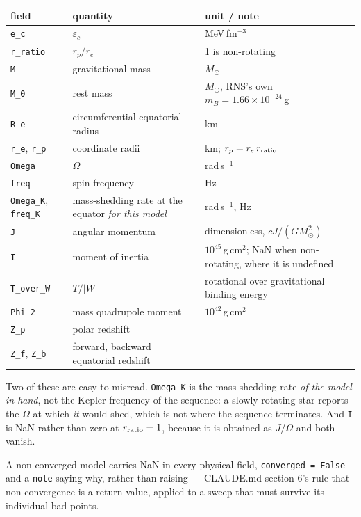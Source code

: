 \documentclass[aps,prc,onecolumn,superscriptaddress,nofootinbib,10pt]{revtex4-2}
\newcommand{\Msun}{M_\odot}
\begin{document}
\begin{center}
\begin{tabular}{lll}
\toprule
field & quantity & unit / note \\
\midrule
\texttt{e\_c}      & $\varepsilon_c$                    & MeV\,fm$^{-3}$ \\
\texttt{r\_ratio}  & $r_p/r_e$                          & 1 is non-rotating \\
\texttt{M}         & gravitational mass                  & $\Msun$ \\
\texttt{M\_0}      & rest mass                          & $\Msun$, RNS's own $m_B = 1.66\times10^{-24}$\,g \\
\texttt{R\_e}      & circumferential equatorial radius   & km \\
\texttt{r\_e}, \texttt{r\_p} & coordinate radii         & km; $r_p = r_e\,r_{\rm ratio}$ \\
\texttt{Omega}     & $\Omega$                            & rad\,s$^{-1}$ \\
\texttt{freq}      & spin frequency                      & Hz \\
\texttt{Omega\_K}, \texttt{freq\_K} & mass-shedding rate at the equator \emph{for this model} & rad\,s$^{-1}$, Hz \\
\texttt{J}         & angular momentum                    & dimensionless, $cJ/(G\Msun^2)$ \\
\texttt{I}         & moment of inertia                   & $10^{45}$\,g\,cm$^2$; NaN when non-rotating, where it is undefined \\
\texttt{T\_over\_W} & $T/|W|$                            & rotational over gravitational binding energy \\
\texttt{Phi\_2}    & mass quadrupole moment              & $10^{42}$\,g\,cm$^2$ \\
\texttt{Z\_p}      & polar redshift                      & \\
\texttt{Z\_f}, \texttt{Z\_b} & forward, backward equatorial redshift & \\
\bottomrule
\end{tabular}
\end{center}

\noindent
Two of these are easy to misread. \texttt{Omega\_K} is the mass-shedding rate
\emph{of the model in hand}, not the Kepler frequency of the sequence: a slowly
rotating star reports the $\Omega$ at which \emph{it} would shed, which is not
where the sequence terminates. And \texttt{I} is NaN rather than zero at
$r_{\rm ratio} = 1$, because it is obtained as $J/\Omega$ and both vanish.

A non-converged model carries NaN in every physical field, \texttt{converged =
False} and a \texttt{note} saying why, rather than raising --- CLAUDE.md
section 6's rule that non-convergence is a return value, applied to a sweep that
must survive its individual bad points.



\end{document}
